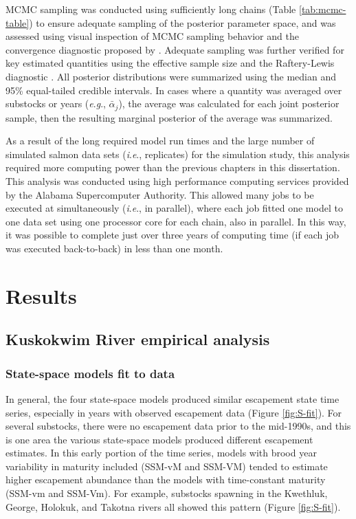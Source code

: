 \documentclass[12pt,]{book}
\theoremstyle{definition}
\theoremstyle{definition}
\theoremstyle{definition}
\theoremstyle{remark}
\begin{document}
MCMC sampling was conducted using sufficiently long chains (Table
\ref{tab:mcmc-table}) to ensure adequate sampling of the posterior
parameter space, and was assessed using visual inspection of MCMC
sampling behavior and the convergence diagnostic proposed by
\citet{brooks-gelman-1998}. Adequate sampling was further verified for
key estimated quantities using the effective sample size and the
Raftery-Lewis diagnostic \citep{raftery-lewis-1992}. All posterior
distributions were summarized using the median and 95\% equal-tailed
credible intervals. In cases where a quantity was averaged over
substocks or years (\emph{e}.\emph{g}., \(\bar{\alpha}_j\)), the average
was calculated for each joint posterior sample, then the resulting
marginal posterior of the average was summarized.

As a result of the long required model run times and the large number of
simulated salmon data sets (\emph{i}.\emph{e}., replicates) for the
simulation study, this analysis required more computing power than the
previous chapters in this dissertation. This analysis was conducted
using high performance computing services provided by the Alabama
Supercomputer Authority. This allowed many jobs to be executed at
simultaneously (\emph{i}.\emph{e}., in parallel), where each job fitted
one model to one data set using one processor core for each chain, also
in parallel. In this way, it was possible to complete just over three
years of computing time (if each job was executed back-to-back) in less
than one month.

\section{Results}\label{results-2}

\subsection{Kuskokwim River empirical
analysis}\label{kuskokwim-river-empirical-analysis}

\subsubsection{State-space models fit to data}\label{ssm-fit}

\noindent
In general, the four state-space models produced similar escapement
state time series, especially in years with observed escapement data
(Figure \ref{fig:S-fit}). For several substocks, there were no
escapement data prior to the mid-1990s, and this is one area the various
state-space models produced different escapement estimates. In this
early portion of the time series, models with brood year variability in
maturity included (SSM-vM and SSM-VM) tended to estimate higher
escapement abundance than the models with time-constant maturity (SSM-vm
and SSM-Vm). For example, substocks spawning in the Kwethluk, George,
Holokuk, and Takotna rivers all showed this pattern (Figure
\ref{fig:S-fit}).
\end{document}
